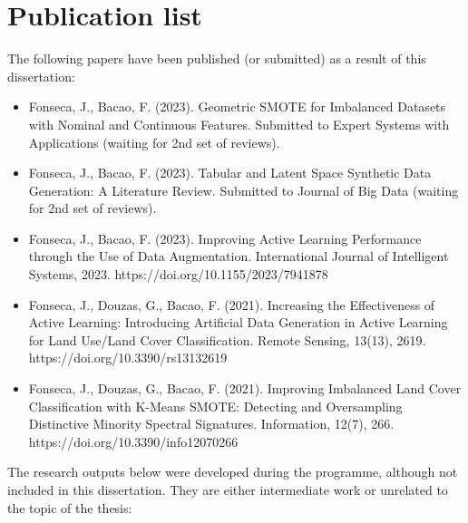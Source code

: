 \chapter*{Publication list}

The following papers have been published (or submitted) as a result of this
dissertation:

\begin{itemize}

    \item Fonseca, J., Bacao, F. (2023). Geometric SMOTE for Imbalanced
        Datasets with Nominal and Continuous Features. Submitted to Expert
        Systems with Applications (waiting for 2nd set of reviews).

    \item Fonseca, J., Bacao, F. (2023). Tabular and Latent Space Synthetic
        Data Generation: A Literature Review. Submitted to Journal of Big
        Data (waiting for 2nd set of reviews).

    \item Fonseca, J., Bacao, F. (2023). Improving Active Learning
        Performance through the Use of Data Augmentation. International
        Journal of Intelligent Systems, 2023.
        https://doi.org/10.1155/2023/7941878

    \item Fonseca, J., Douzas, G., Bacao, F. (2021). Increasing the
        Effectiveness of Active Learning: Introducing Artificial Data
        Generation in Active Learning for Land Use/Land Cover Classification.
        Remote Sensing, 13(13), 2619.  https://doi.org/10.3390/rs13132619

    \item Fonseca, J., Douzas, G., Bacao, F. (2021). Improving Imbalanced Land
        Cover Classification with K-Means SMOTE: Detecting and Oversampling
        Distinctive Minority Spectral Signatures. Information, 12(7), 266.
        https://doi.org/10.3390/info12070266

\end{itemize}

The research outputs below were developed during the programme, although
not included in this dissertation. They are either intermediate work or
unrelated to the topic of the thesis:

